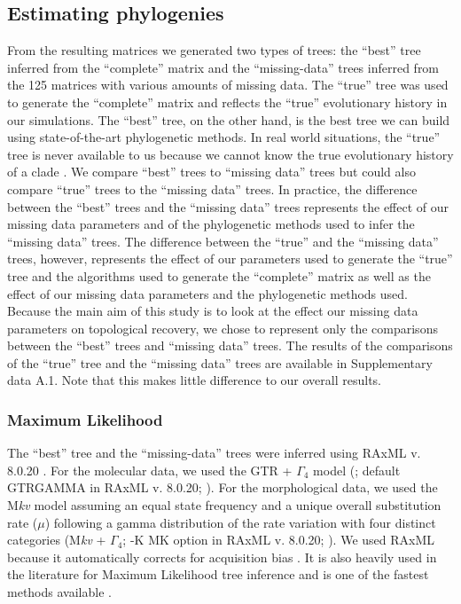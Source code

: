 \subsection{Estimating phylogenies}
From the resulting matrices we generated two types of trees: the ``best'' tree inferred from the ``complete'' matrix and the ``missing-data'' trees inferred from the 125 matrices with various amounts of missing data.
The ``true'' tree was used to generate the ``complete'' matrix and reflects the ``true'' evolutionary history in our simulations.
The ``best'' tree, on the other hand, is the best tree we can build using state-of-the-art phylogenetic methods.
In real world situations, the ``true'' tree is never available to us because we cannot know the true evolutionary history of a clade \citep[except in very rare circumstances, e.g.][]{rozen2005}.
We compare ``best'' trees to ``missing data'' trees but could also compare ``true'' trees to the ``missing data'' trees.
In practice, the difference between the ``best'' trees and the ``missing data'' trees represents the effect of our missing data parameters and of the phylogenetic methods used to infer the ``missing data'' trees.
The difference between the ``true'' and the ``missing data'' trees, however, represents the effect of our parameters used to generate the ``true'' tree and the algorithms used to generate the ``complete'' matrix as well as the effect of our missing data parameters and the phylogenetic methods used.
Because the main aim of this study is to look at the effect our missing data parameters on topological recovery, we chose to represent only the comparisons between the ``best'' trees and ``missing data'' trees.
The results of the comparisons of the ``true'' tree and the ``missing data'' trees are available in Supplementary data A.1. %
Note that this makes little difference to our overall results.

\subsubsection*{Maximum Likelihood}
The ``best'' tree and the ``missing-data'' trees were inferred using RAxML v. 8.0.20 \citep{Stamatakis21012014}. For the molecular data, we used the GTR + $\Gamma_4$ model (\citealp{tavare1986}; default GTRGAMMA in RAxML v. 8.0.20; \citealp{Stamatakis21012014}).
For the morphological data, we used the M\textit{kv} model \citep{lewisa2001} assuming an equal state frequency and a unique overall substitution rate ($\mu$) following a gamma distribution of the rate variation with four distinct categories (M\textit{kv} + $\Gamma_4$; -K MK option in RAxML v. 8.0.20; \citealp{Stamatakis21012014}).
We used RAxML because it automatically corrects for acquisition bias \citep{lewisa2001}. It is also heavily used in the literature for Maximum Likelihood tree inference \citep[e.g.][]{rouresite-specific2011,Bogdanowicz2012,springermacroevolutionary2012,O'Leary08022013,kellymolecular2014} and is one of the fastest methods available \citep{Stamatakis01102008}. 

